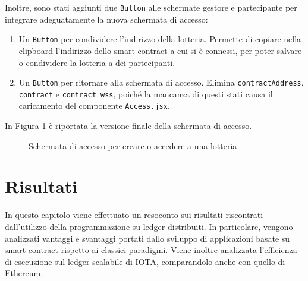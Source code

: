 \documentclass[12pt,a4paper,openright,twoside]{report}
\begin{document}
Inoltre, sono stati aggiunti due \texttt{Button} alle schermate gestore e partecipante per integrare adeguatamente la nuova schermata di accesso:
\begin{enumerate}
    \item Un \texttt{Button} per condividere l'indirizzo della lotteria. Permette di copiare nella clipboard l'indirizzo dello smart contract a cui si è connessi, per poter salvare o condividere la lotteria a dei partecipanti.
    \item Un \texttt{Button} per ritornare alla schermata di accesso. Elimina \texttt{contractAddress}, \texttt{contract} e \texttt{contract\_wss}, poiché la mancanza di questi stati causa il caricamento del componente \texttt{Access.jsx}.
\end{enumerate}
In Figura \ref{fig:access_view} è riportata la versione finale della schermata di accesso.

\begin{figure}[h]
\begin{center}
\caption[Schermata di accesso]{Schermata di accesso per creare o accedere a una lotteria}\label{fig:access_view}
\end{center}
\end{figure}

\clearpage{\pagestyle{empty}\cleardoublepage}



\chapter{Risultati}
\label{chap:results}
In questo capitolo viene effettuato un resoconto sui risultati riscontrati dall'utilizzo della programmazione su ledger distribuiti. In particolare, vengono analizzati vantaggi e svantaggi portati dallo sviluppo di applicazioni basate su smart contract rispetto ai classici paradigmi. Viene inoltre analizzata l'efficienza di esecuzione sul ledger scalabile di IOTA, comparandolo anche con quello di Ethereum. 
\end{document}
